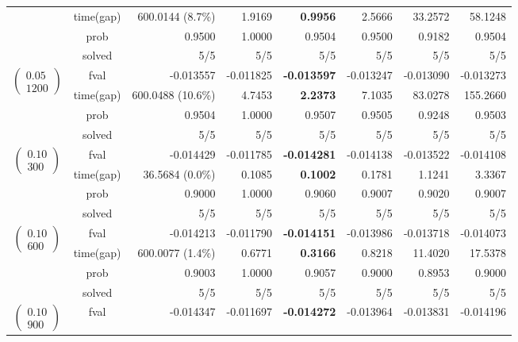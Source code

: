 \documentclass[11pt]{article}
\begin{document}
\begin{table}[ht!]
\begin{tabular}{ccrrrrrr}
& time(gap)  & 600.0144 (8.7\%) & 1.9169 & \textbf{0.9956} & 2.5666 & 33.2572 & 58.1248\\
& prob  & 0.9500 & 1.0000 & 0.9504 & 0.9500 & 0.9182 & 0.9504\\
& solved & 5/5 & 5/5 & 5/5 & 5/5 & 5/5 & 5/5\\
\midrule
\multirow{4}{*}{$\left(\begin{array}{c} 0.05 \\ 1200 \end{array}\right)$} & fval  & -0.013557 & -0.011825 & \textbf{-0.013597} & -0.013247 & -0.013090 & -0.013273\\
& time(gap)  & 600.0488 (10.6\%) & 4.7453 & \textbf{2.2373} & 7.1035 & 83.0278 & 155.2660\\
& prob  & 0.9504 & 1.0000 & 0.9507 & 0.9505 & 0.9248 & 0.9503\\
& solved & 5/5 & 5/5 & 5/5 & 5/5 & 5/5 & 5/5\\
\midrule\midrule
\multirow{4}{*}{$\left(\begin{array}{c} 0.10 \\ 300 \end{array}\right)$} & fval  & -0.014429 & -0.011785 & \textbf{-0.014281} & -0.014138 & -0.013522 & -0.014108\\
& time(gap)  & 36.5684 (0.0\%) & 0.1085 & \textbf{0.1002} & 0.1781 & 1.1241 & 3.3367\\
& prob  & 0.9000 & 1.0000 & 0.9060 & 0.9007 & 0.9020 & 0.9007\\
& solved & 5/5 & 5/5 & 5/5 & 5/5 & 5/5 & 5/5\\
\midrule
\multirow{4}{*}{$\left(\begin{array}{c} 0.10 \\ 600 \end{array}\right)$} & fval  & -0.014213 & -0.011790 & \textbf{-0.014151} & -0.013986 & -0.013718 & -0.014073\\
& time(gap)  & 600.0077 (1.4\%) & 0.6771 & \textbf{0.3166} & 0.8218 & 11.4020 & 17.5378\\
& prob  & 0.9003 & 1.0000 & 0.9057 & 0.9000 & 0.8953 & 0.9000\\
& solved & 5/5 & 5/5 & 5/5 & 5/5 & 5/5 & 5/5\\
\midrule
\multirow{4}{*}{$\left(\begin{array}{c} 0.10 \\ 900 \end{array}\right)$} & fval  & -0.014347 & -0.011697 & \textbf{-0.014272} & -0.013964 & -0.013831 & -0.014196\\

\end{tabular}
\end{table}
\end{document}
